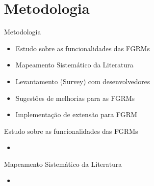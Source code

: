 \documentclass[t,14pt,mathserif]{beamer}
\begin{document}
\section{Metodologia}

\begin{frame}{Metodologia}

    \begin{itemize}
        \item Estudo sobre as funcionalidades das FGRMs
        \item Mapeamento Sistemático da Literatura~\cite{Petersen2008}
        \item Levantamento (Survey) com
              desenvolvedores~\cite{wohlin2012experimentation}
        \item Sugestões de melhorias para as FGRMs
        \item Implementação de extensão para FGRM
    \end{itemize}
\end{frame}

\begin{frame}{Estudo sobre as funcionalidades das FGRMs}

    \begin{itemize}
        \item
    \end{itemize}

\end{frame}

\begin{frame}{Mapeamento Sistemático da Literatura}

    \begin{itemize}
        \item
    \end{itemize}

\end{frame}
\end{document}
